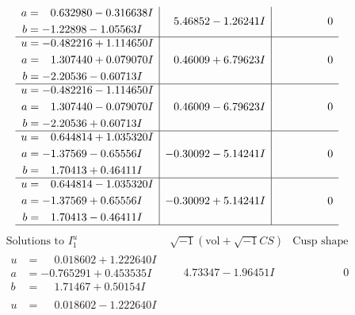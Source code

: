\documentclass[1p]{elsarticle_modified}
\theoremstyle{definition}
\newcommand{\I}{\sqrt{-1}}
\begin{document}
$$\begin{array}{c|c|c}
\begin{aligned}
a &= \phantom{-}0.632980 - 0.316638 I \\
b &= -1.22898 - 1.05563 I\end{aligned}
 & \phantom{-}5.46852 - 1.26241 I & \phantom{-0.000000 } 0 \\ \hline\begin{aligned}
u &= -0.482216 + 1.114650 I \\
a &= \phantom{-}1.307440 + 0.079070 I \\
b &= -2.20536 - 0.60713 I\end{aligned}
 & \phantom{-}0.46009 + 6.79623 I & \phantom{-0.000000 } 0 \\ \hline\begin{aligned}
u &= -0.482216 - 1.114650 I \\
a &= \phantom{-}1.307440 - 0.079070 I \\
b &= -2.20536 + 0.60713 I\end{aligned}
 & \phantom{-}0.46009 - 6.79623 I & \phantom{-0.000000 } 0 \\ \hline\begin{aligned}
u &= \phantom{-}0.644814 + 1.035320 I \\
a &= -1.37569 - 0.65556 I \\
b &= \phantom{-}1.70413 + 0.46411 I\end{aligned}
 & -0.30092 - 5.14241 I & \phantom{-0.000000 } 0 \\ \hline\begin{aligned}
u &= \phantom{-}0.644814 - 1.035320 I \\
a &= -1.37569 + 0.65556 I \\
b &= \phantom{-}1.70413 - 0.46411 I\end{aligned}
 & -0.30092 + 5.14241 I & \phantom{-0.000000 } 0\\
 \hline 
 \end{array}$$\newpage$$\begin{array}{c|c|c}  
\text{Solutions to }I^u_{1}& \I (\text{vol} + \sqrt{-1}CS) & \text{Cusp shape}\\
 \hline 
\begin{aligned}
u &= \phantom{-}0.018602 + 1.222640 I \\
a &= -0.765291 + 0.453535 I \\
b &= \phantom{-}1.71467 + 0.50154 I\end{aligned}
 & \phantom{-}4.73347 - 1.96451 I & \phantom{-0.000000 } 0 \\ \hline\begin{aligned}
u &= \phantom{-}0.018602 - 1.222640 I \\

\end{aligned}
\end{array}$$
\end{document}
